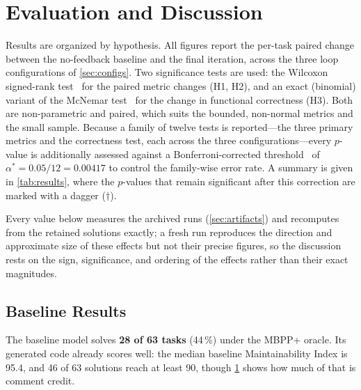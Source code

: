 
\section{Evaluation and Discussion}
\label{sec:results}

Results are organized by hypothesis. All figures report the per-task paired change
between the no-feedback baseline and the final iteration, across the three loop
configurations of \cref{sec:configs}. Two significance tests are used: the
Wilcoxon signed-rank test~\citep{wilcoxon1945signedrank} for the paired metric
changes (H1, H2), and an exact (binomial) variant of the McNemar
test~\citep{mcnemar1947} for the change in
functional correctness (H3). Both are non-parametric
and paired, which suits the bounded, non-normal metrics and the small sample.
Because a family of twelve tests is reported---the three primary metrics and the
correctness test, each across the three configurations---every $p$-value is
additionally assessed against a Bonferroni-corrected
threshold~\citep{dunn1961multiple} of
$\alpha^\ast = 0.05/12 = 0.00417$ to control the family-wise error rate. A
summary is given in \cref{tab:results}, where the $p$-values that remain
significant after this correction are marked with a dagger ($\dagger$).

Every value below measures the archived runs (\cref{sec:artifacts}) and recomputes
from the retained solutions exactly; a fresh run reproduces the direction and
approximate size of these effects but not their precise figures, so the discussion
rests on the sign, significance, and ordering of the effects rather than their exact
magnitudes.

\subsection{Baseline Results}
The baseline model solves \textbf{28 of 63 tasks} (44\,\%) under the MBPP+ oracle.
Its generated code already scores well: the median baseline Maintainability Index
is 95.4, and 46 of 63 solutions reach at least 90, though \cref{sec:results}
shows how much of that is comment credit.

